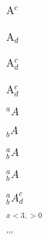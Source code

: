 \documentclass{article}
\begin{document}
A$^c$

A$_d$

A$^c_d$

A$_d^c$


$^aA$

$_bA$

$^a_bA$

$_b^aA$

$_b^aA^c_d$

$_{x<3,>0}$

$^{\prime\prime\prime}$
\end{document}

